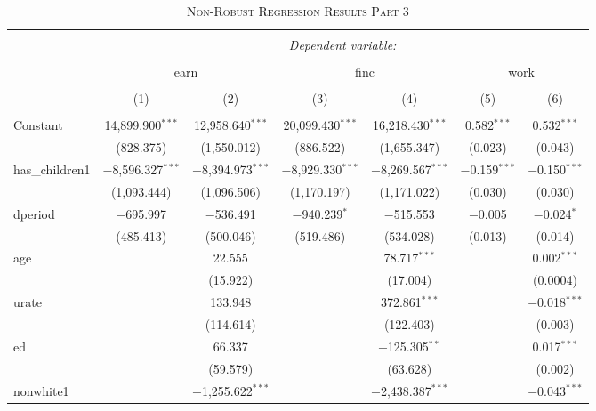 \documentclass[a4paper]{article}
\begin{document}
\begin{table}[!htbp] \centering 
\begin{adjustwidth}{0.cm}{-0cm}
\begin{threeparttable}
\small
\captionsetup{font=small, justification=raggedright,singlelinecheck=false}
\caption{\textsc{Non-Robust Regression Results Part 3}}
\centering 
  \label{}
\small 
\begin{tabular}{@{\extracolsep{-2pt}}lcccccc} 
\\[-5.8ex]\hline 
\hline \\[-1.8ex] 
 & \multicolumn{6}{c}{\textit{Dependent variable:}} \\ 
\cline{2-7} 
\\[-1.8ex] & \multicolumn{2}{c}{earn} & \multicolumn{2}{c}{finc} & \multicolumn{2}{c}{work} \\ 
\\[-1.8ex] & (1) & (2) & (3) & (4) & (5) & (6)\\ 
\hline \\[-1.8ex] 
 Constant & 14,899.900$^{***}$ & 12,958.640$^{***}$ & 20,099.430$^{***}$ & 16,218.430$^{***}$ & 0.582$^{***}$ & 0.532$^{***}$ \\ 
  & (828.375) & (1,550.012) & (886.522) & (1,655.347) & (0.023) & (0.043) \\ 
  has\_children1 & $-$8,596.327$^{***}$ & $-$8,394.973$^{***}$ & $-$8,929.330$^{***}$ & $-$8,269.567$^{***}$ & $-$0.159$^{***}$ & $-$0.150$^{***}$ \\ 
  & (1,093.444) & (1,096.506) & (1,170.197) & (1,171.022) & (0.030) & (0.030) \\ 
  dperiod & $-$695.997 & $-$536.491 & $-$940.239$^{*}$ & $-$515.553 & $-$0.005 & $-$0.024$^{*}$ \\ 
  & (485.413) & (500.046) & (519.486) & (534.028) & (0.013) & (0.014) \\ 
  age &  & 22.555 &  & 78.717$^{***}$ &  & 0.002$^{***}$ \\ 
  &  & (15.922) &  & (17.004) &  & (0.0004) \\ 
  urate &  & 133.948 &  & 372.861$^{***}$ &  & $-$0.018$^{***}$ \\ 
  &  & (114.614) &  & (122.403) &  & (0.003) \\ 
  ed &  & 66.337 &  & $-$125.305$^{**}$ &  & 0.017$^{***}$ \\ 
  &  & (59.579) &  & (63.628) &  & (0.002) \\ 
  nonwhite1 &  & $-$1,255.622$^{***}$ &  & $-$2,438.387$^{***}$ &  & $-$0.043$^{***}$ \\ 

\end{tabular}
\end{threeparttable}
\end{adjustwidth}
\end{table}
\end{document}
